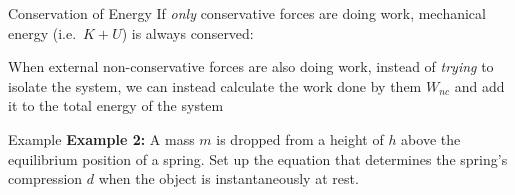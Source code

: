 \documentclass[12pt,compress,aspectratio=169]{beamer}
\begin{document}
\begin{frame}{Conservation of Energy}
  If \emph{only} conservative forces are doing work, mechanical energy (i.e.\
  $K+U$) is always conserved:

  
  When external non-conservative forces are also doing work, instead of
  \emph{trying} to isolate the system, we can instead calculate the work done
  by them $W_{nc}$ and add it to the total energy of the system
    
\end{frame}



\begin{frame}{Example}
  \textbf{Example 2:} A mass $m$ is dropped from a height of $h$ above the
  equilibrium position of a spring. Set up the equation that determines the
  spring's compression $d$ when the object is instantaneously at rest.
  \begin{center}
  \end{center}
\end{frame}


\end{document}
